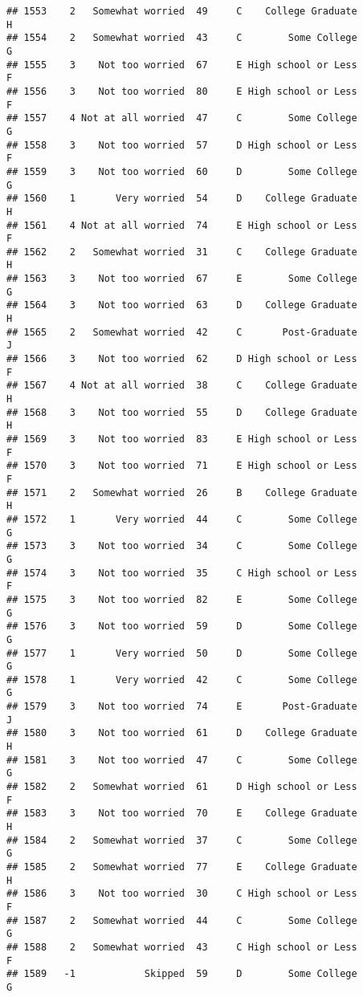 \documentclass[
]{article}
\begin{document}
\begin{verbatim}
## 1553    2   Somewhat worried  49     C    College Graduate         H
## 1554    2   Somewhat worried  43     C        Some College         G
## 1555    3    Not too worried  67     E High school or Less         F
## 1556    3    Not too worried  80     E High school or Less         F
## 1557    4 Not at all worried  47     C        Some College         G
## 1558    3    Not too worried  57     D High school or Less         F
## 1559    3    Not too worried  60     D        Some College         G
## 1560    1       Very worried  54     D    College Graduate         H
## 1561    4 Not at all worried  74     E High school or Less         F
## 1562    2   Somewhat worried  31     C    College Graduate         H
## 1563    3    Not too worried  67     E        Some College         G
## 1564    3    Not too worried  63     D    College Graduate         H
## 1565    2   Somewhat worried  42     C       Post-Graduate         J
## 1566    3    Not too worried  62     D High school or Less         F
## 1567    4 Not at all worried  38     C    College Graduate         H
## 1568    3    Not too worried  55     D    College Graduate         H
## 1569    3    Not too worried  83     E High school or Less         F
## 1570    3    Not too worried  71     E High school or Less         F
## 1571    2   Somewhat worried  26     B    College Graduate         H
## 1572    1       Very worried  44     C        Some College         G
## 1573    3    Not too worried  34     C        Some College         G
## 1574    3    Not too worried  35     C High school or Less         F
## 1575    3    Not too worried  82     E        Some College         G
## 1576    3    Not too worried  59     D        Some College         G
## 1577    1       Very worried  50     D        Some College         G
## 1578    1       Very worried  42     C        Some College         G
## 1579    3    Not too worried  74     E       Post-Graduate         J
## 1580    3    Not too worried  61     D    College Graduate         H
## 1581    3    Not too worried  47     C        Some College         G
## 1582    2   Somewhat worried  61     D High school or Less         F
## 1583    3    Not too worried  70     E    College Graduate         H
## 1584    2   Somewhat worried  37     C        Some College         G
## 1585    2   Somewhat worried  77     E    College Graduate         H
## 1586    3    Not too worried  30     C High school or Less         F
## 1587    2   Somewhat worried  44     C        Some College         G
## 1588    2   Somewhat worried  43     C High school or Less         F
## 1589   -1            Skipped  59     D        Some College         G

\end{verbatim}
\end{document}
